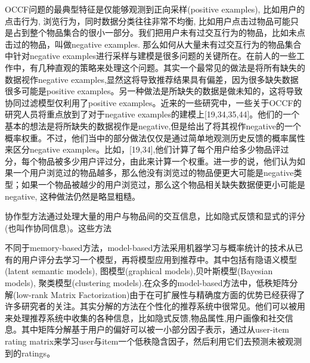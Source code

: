 OCCF问题的最典型特征是仅能够观测到正向采样(positive examples), 比如用户的点击行为, 浏览行为，同时数据分类往往非常不均衡, 比如用户点击过物品可能只是占到整个物品集合的很小一部分。我们把用户未有过交互行为的物品，比如未点击过的物品，叫做negative examples. 那么如何从大量未有过交互行为的物品集合中针对negative examples进行采样与建模是很多问题的关键所在。在前人的一些工作中，有几种直观的策略来处理这个问题。其实一个最常见的做法是将所有缺失的数据视作negative examples,显然这将导致推荐结果具有偏差，因为很多缺失数据很多可能是positive examples。另一种做法是所缺失的数据是做未知的，这将导致协同过滤模型仅利用了positive examples。近来的一些研究中，一些关于OCCF的研究人员将重点放到了对于negative examples的建模上[19,34,35,44]。他们的一个基本的想法是将所缺失的数据视作是negative,但是给出了将其视作negative的一个概率权重。不过，他们当中的部分做法仅仅是通过简单地观测历史反馈的概率属性来区分negative examples。比如，[19,34],他们计算了每个用户给多少物品评过分，每个物品被多少用户评过分，由此来计算一个权重。进一步的说，他们认为如果一个用户浏览过的物品越多，那么他没有浏览过的物品便更大可能是negative类型；如果一个物品被越少的用户浏览过，那么这个物品相关缺失数据便更小可能是negative, 这种做法仍然是略显粗糙。

协作型方法\cite{rendle2009bpr,yu2013recommendation,zhong2014adaptive}通过处理大量的用户与物品间的交互信息，比如隐式反馈和显式的评分(也叫作协同信息)。这些方法

不同于memory-based方法，model-based方法采用机器学习与概率统计的技术从已有的用户评分去学习一个模型，再将模型应用到推荐中。其中包括有隐语义模型(latent semantic models), 图模型(graphical models),贝叶斯模型(Bayesian models), 聚类模型(clustering models).在众多的model-based方法中，低秩矩阵分解(low-rank Matrix Factorization)由于在可扩展性与精确度方面的优势已经获得了许多研究者的关注。其实分解的方法在个性化的推荐系统中很常见。他们可以被用来处理推荐系统中收集的各种信息，比如隐式反馈\cite{hu2008collaborative,rendle2009bpr},物品属性\cite{gantner2010learning,rendle2012factorization},用户画像\cite{hong2013co}和社交信息\cite{ma2011recommender}。其中矩阵分解基于用户的偏好可以被一小部分因子表示，通过从user-item rating matrix来学习user与item一个低秩隐含因子，然后利用它们去预测未被观测到的ratings。

